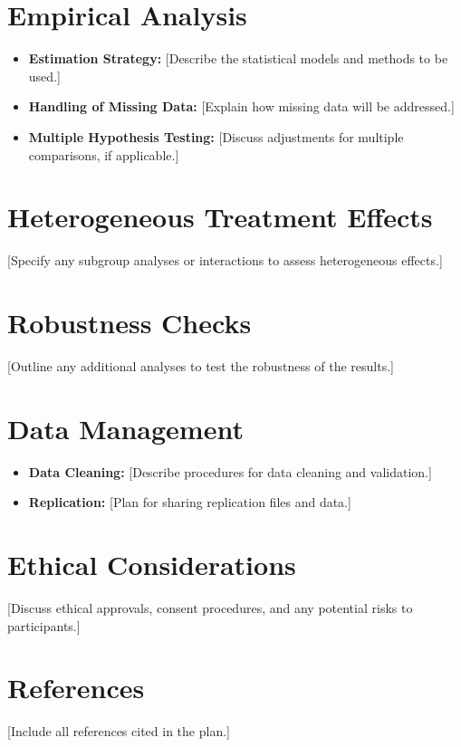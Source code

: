 \documentclass[
  letterpaper,
  DIV=11,
  numbers=noendperiod]{scrartcl}
\providecommand{\tightlist}{%
  \setlength{\itemsep}{0pt}\setlength{\parskip}{0pt}}\usepackage{longtable,booktabs,array}
\begin{document}
\section{Empirical Analysis}\label{empirical-analysis}

\begin{itemize}
\tightlist
\item
  \textbf{Estimation Strategy:} {[}Describe the statistical models and
  methods to be used.{]}
\item
  \textbf{Handling of Missing Data:} {[}Explain how missing data will be
  addressed.{]}
\item
  \textbf{Multiple Hypothesis Testing:} {[}Discuss adjustments for
  multiple comparisons, if applicable.{]}
\end{itemize}

\section{Heterogeneous Treatment
Effects}\label{heterogeneous-treatment-effects}

{[}Specify any subgroup analyses or interactions to assess heterogeneous
effects.{]}

\section{Robustness Checks}\label{robustness-checks}

{[}Outline any additional analyses to test the robustness of the
results.{]}

\section{Data Management}\label{data-management}

\begin{itemize}
\tightlist
\item
  \textbf{Data Cleaning:} {[}Describe procedures for data cleaning and
  validation.{]}
\item
  \textbf{Replication:} {[}Plan for sharing replication files and
  data.{]}
\end{itemize}

\section{Ethical Considerations}\label{ethical-considerations}

{[}Discuss ethical approvals, consent procedures, and any potential
risks to participants.{]}

\section{References}\label{references}

{[}Include all references cited in the plan.{]}
\end{document}
